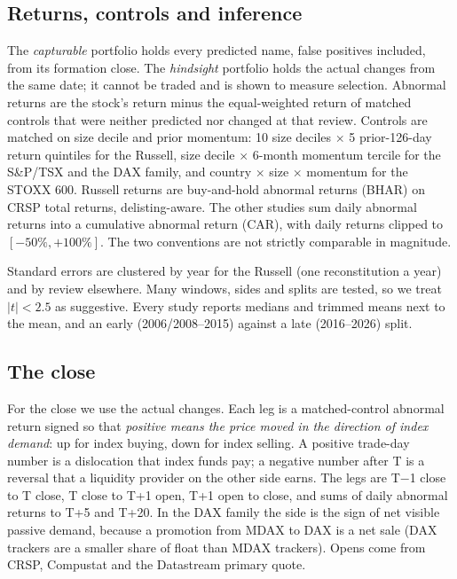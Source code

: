 \documentclass[10pt, a4paper, twocolumn]{article}
\begin{document}
\subsection{Returns, controls and inference}

The \emph{capturable} portfolio holds every predicted name, false positives included, from its formation close. The \emph{hindsight} portfolio holds the actual changes from the same date; it cannot be traded and is shown to measure selection. Abnormal returns are the stock's return minus the equal-weighted return of matched controls that were neither predicted nor changed at that review. Controls are matched on size decile and prior momentum: 10 size deciles $\times$ 5 prior-126-day return quintiles for the Russell, size decile $\times$ 6-month momentum tercile for the S\&P/TSX and the DAX family, and country $\times$ size $\times$ momentum for the STOXX 600. Russell returns are buy-and-hold abnormal returns (BHAR) on CRSP total returns, delisting-aware. The other studies sum daily abnormal returns into a cumulative abnormal return (CAR), with daily returns clipped to $[-50\%, +100\%]$. The two conventions are not strictly comparable in magnitude.

Standard errors are clustered by year for the Russell (one reconstitution a year) and by review elsewhere. Many windows, sides and splits are tested, so we treat $|t| < 2.5$ as suggestive. Every study reports medians and trimmed means next to the mean, and an early (2006/2008--2015) against a late (2016--2026) split.

\subsection{The close}

For the close we use the actual changes. Each leg is a matched-control abnormal return signed so that \emph{positive means the price moved in the direction of index demand}: up for index buying, down for index selling. A positive trade-day number is a dislocation that index funds pay; a negative number after T is a reversal that a liquidity provider on the other side earns. The legs are T$-$1 close to T close, T close to T+1 open, T+1 open to close, and sums of daily abnormal returns to T+5 and T+20. In the DAX family the side is the sign of net visible passive demand, because a promotion from MDAX to DAX is a net sale (DAX trackers are a smaller share of float than MDAX trackers). Opens come from CRSP, Compustat and the Datastream primary quote.
\end{document}
